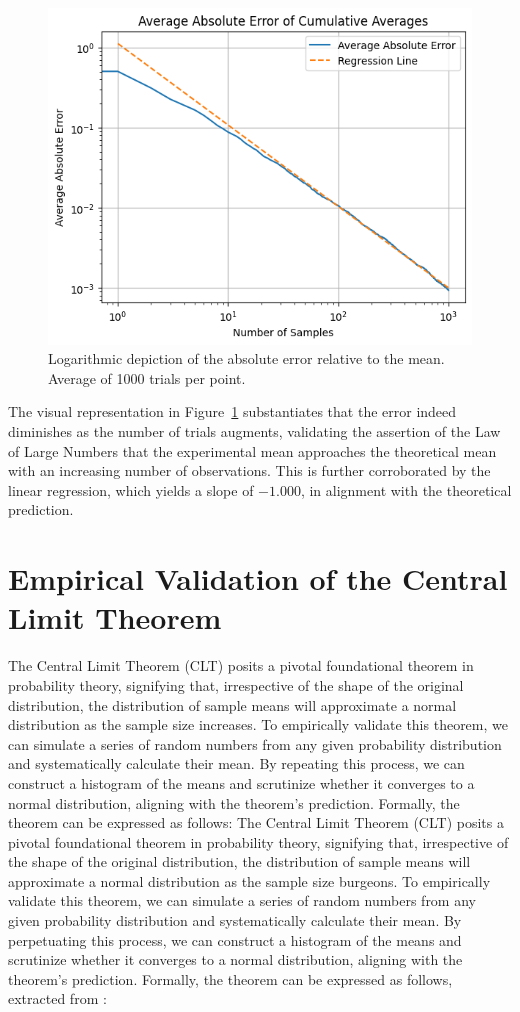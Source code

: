 \documentclass{report}
\begin{document}
\begin{figure}[H]
	\centering
	\includegraphics[width=0.5\linewidth]{./Figures/LLN/verifloglog.png}
	\caption{Logarithmic depiction of the absolute error relative to the mean. Average of 1000 trials per point.}
	\label{fig:verificationllnlog}
\end{figure}

The visual representation in Figure~\ref{fig:verificationllnlog} substantiates that the error indeed diminishes as the number of trials augments, validating the assertion of the Law of Large Numbers that the experimental mean approaches the theoretical mean with an increasing number of observations. This is further corroborated by the linear regression, which yields a slope of \(-1.000\), in alignment with the theoretical prediction.

\section{Empirical Validation of the Central Limit Theorem}
\label{sec:clt}

The Central Limit Theorem (CLT) posits a pivotal foundational theorem in probability theory, signifying that, irrespective of the shape of the original distribution, the distribution of sample means will approximate a normal distribution as the sample size increases. To empirically validate this theorem, we can simulate a series of random numbers from any given probability distribution and systematically calculate their mean. By repeating this process, we can construct a histogram of the means and scrutinize whether it converges to a normal distribution, aligning with the theorem's prediction. Formally, the theorem can be expressed as follows:
The Central Limit Theorem (CLT) posits a pivotal foundational theorem in probability theory, signifying that, irrespective of the shape of the original distribution, the distribution of sample means will approximate a normal distribution as the sample size burgeons. To empirically validate this theorem, we can simulate a series of random numbers from any given probability distribution and systematically calculate their mean. By perpetuating this process, we can construct a histogram of the means and scrutinize whether it converges to a normal distribution, aligning with the theorem's prediction. Formally, the theorem can be expressed as follows, extracted from \cite{jourdain2016probabilites}:
\end{document}
